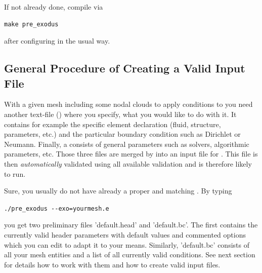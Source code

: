 If not already done, compile \prexo via \begin{verbatim}make pre_exodus\end{verbatim} after 
configuring \baci{} in the usual way.

\subsection{General Procedure of Creating a Valid \baci{} Input File}
With a given mesh including some nodal clouds to apply conditions to you need
another text-file {(\bc)} where you specify, what you would like to do with
it. It contains for example the specific element declaration (fluid, structure,
parameters, etc.) and the particular boundary condition such as Dirichlet or
Neumann. Finally, a \head consists of general parameters such as
solvers, algorithmic parameters, etc. Those three files are merged by \prexo
into an input file for \baci{}. This file is then \emph{automatically} validated
using all available \baci{} validation and is therefore likely to run.

Sure, you usually do not have already a proper \head and matching \bc. By
typing
\begin{center}
  \verb|./pre_exodus --exo=yourmesh.e|
\end{center}
you get two preliminary files
'default.head' and 'default.bc'. The first contains the currently valid header
parameters with default values and commented options which you can edit to
adapt it to your means. Similarly, 'default.bc' consists of all your mesh
entities and a list of all currently valid conditions. See next section for
details how to work with them and how to create valid input files.



